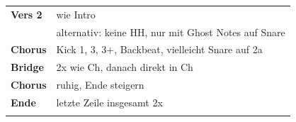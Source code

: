 \begin{tabular}{p{1.6cm}l}
	\textbf{Vers 2} & wie Intro                                           \\
	                & alternativ: keine HH, nur mit Ghost Notes auf Snare \\
	\textbf{Chorus} & Kick 1, 3, 3+, Backbeat, vielleicht Snare auf 2a    \\
	\textbf{Bridge} & 2x wie Ch, danach direkt in Ch                         \\
	\textbf{Chorus} & ruhig, Ende steigern                                \\
	\textbf{Ende}   & letzte Zeile insgesamt 2x                           \\
	                &                                                     \\
\end{tabular}
